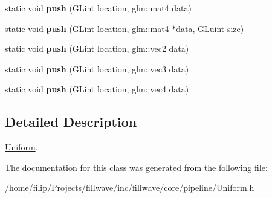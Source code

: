 \begin{DoxyCompactItemize}
\item 
static void {\bfseries push} (G\+Lint location, glm\+::mat4 data)\hypertarget{classflw_1_1flc_1_1Uniform_aa64cb2768bfbb742585f2fba511b0c16}{}\label{classflw_1_1flc_1_1Uniform_aa64cb2768bfbb742585f2fba511b0c16}

\item 
static void {\bfseries push} (G\+Lint location, glm\+::mat4 $\ast$data, G\+Luint size)\hypertarget{classflw_1_1flc_1_1Uniform_a08d7fe5519d1203c4ec64de114e7284f}{}\label{classflw_1_1flc_1_1Uniform_a08d7fe5519d1203c4ec64de114e7284f}

\item 
static void {\bfseries push} (G\+Lint location, glm\+::vec2 data)\hypertarget{classflw_1_1flc_1_1Uniform_a9dec0fc3fbb3d930b6d4f93255c1d869}{}\label{classflw_1_1flc_1_1Uniform_a9dec0fc3fbb3d930b6d4f93255c1d869}

\item 
static void {\bfseries push} (G\+Lint location, glm\+::vec3 data)\hypertarget{classflw_1_1flc_1_1Uniform_af00fb6f4514437ce0c76595a5fbba398}{}\label{classflw_1_1flc_1_1Uniform_af00fb6f4514437ce0c76595a5fbba398}

\item 
static void {\bfseries push} (G\+Lint location, glm\+::vec4 data)\hypertarget{classflw_1_1flc_1_1Uniform_ace5d45016093017303f4db94746cdebc}{}\label{classflw_1_1flc_1_1Uniform_ace5d45016093017303f4db94746cdebc}

\end{DoxyCompactItemize}


\subsection{Detailed Description}
\hyperlink{classflw_1_1flc_1_1Uniform}{Uniform}. 

The documentation for this class was generated from the following file\+:\begin{DoxyCompactItemize}
\item 
/home/filip/\+Projects/fillwave/inc/fillwave/core/pipeline/Uniform.\+h\end{DoxyCompactItemize}
